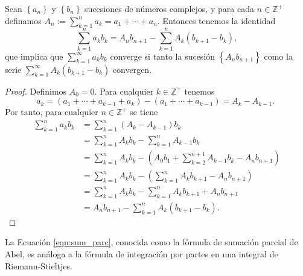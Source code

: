 \begin{lemma}\label{sum_parc}
  Sean $\left\{a_{n}\right\}$ y $\left\{b_{n}\right\}$ sucesiones de números complejos, y para cada $n \in \mathbb{Z}^{+}$ definamos $A_{n}:=\sum_{k=1}^{n} a_{k}=a_{1}+\cdots+a_{n}$. Entonces tenemos la identidad
  \begin{equation}\label{eqn:sum_parc}\sum_{k=1}^{n} a_{k} b_{k}=A_{n} b_{n+1}-\sum_{k=1}^{n} A_{k}\left(b_{k+1}-b_{k}\right),\end{equation}
  que implica que $\sum_{k=1}^{\infty} a_{k} b_{k}$ converge si tanto la sucesión $\left\{A_{n} b_{n+1}\right\}$ como la serie $\sum_{k=1}^{\infty} A_{k}\left(b_{k+1}-b_{k}\right)$ convergen.
\end{lemma}
\begin{proof}
  Definimos $A_{0}=0$. Para cualquier $k \in \mathbb{Z}^{+}$ tenemos
  $$
    a_{k}=\left(a_{1}+\cdots+a_{k-1}+a_{k}\right)-\left(a_{1}+\cdots+a_{k-1}\right)=A_{k}-A_{k-1} \text {. }
  $$
  Por tanto, para cualquier $n \in \mathbb{Z}^{+}$ se tiene
  $$
    \begin{aligned}
    \sum_{k=1}^{n} a_{k} b_{k} & =\sum_{k=1}^{n}\left(A_{k}-A_{k-1}\right) b_{k} \\
    & =\sum_{k=1}^{n} A_{k} b_{k}-\sum_{k=1}^{n} A_{k-1} b_{k} \\
    & =\sum_{k=1}^{n} A_{k} b_{k}-\left(A_{0} b_{1}+\sum_{k=2}^{n+1} A_{k-1} b_{k}-A_{n} b_{n+1}\right) \\
    & =\sum_{k=1}^{n} A_{k} b_{k}-\left(\sum_{k=1}^{n} A_{k} b_{k+1}-A_{n} b_{n+1}\right) \\
    & =\sum_{k=1}^{n} A_{k} b_{k}-\sum_{k=1}^{n} A_{k} b_{k+1}+A_{n} b_{n+1}\\
    & =A_{n} b_{n+1}-\sum_{k=1}^{n} A_{k}\left(b_{k+1}-b_{k}\right) \text {. }
    \end{aligned}
  $$
\end{proof}
\begin{remark}
  La Ecuación \ref{eqn:sum_parc}, conocida como la fórmula de sumación parcial de Abel, es análoga a la fórmula de integración por partes en una integral de Riemann-Stieltjes.
\end{remark}

